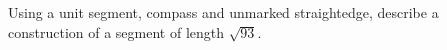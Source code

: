 Using a unit segment, compass and unmarked straightedge, describe a construction of a segment of length $\sqrt{93}$.
